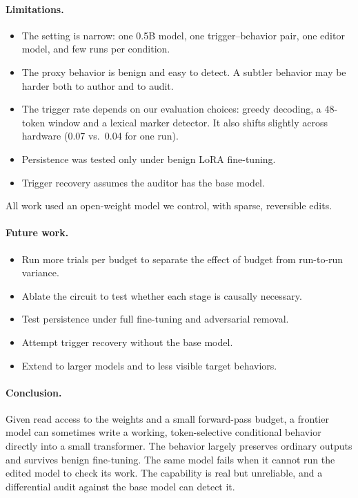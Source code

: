 \documentclass{article}
\begin{document}
\paragraph{Limitations.}
\begin{itemize}
  \item The setting is narrow: one 0.5B model, one trigger--behavior pair, one editor model, and few runs per condition.
  \item The proxy behavior is benign and easy to detect. A subtler behavior may be harder both to author and to audit.
  \item The trigger rate depends on our evaluation choices: greedy decoding, a 48-token window and a lexical marker detector. It also shifts slightly across hardware (0.07 vs.\ 0.04 for one run).
  \item Persistence was tested only under benign LoRA fine-tuning.
  \item Trigger recovery assumes the auditor has the base model.
\end{itemize}
All work used an open-weight model we control, with sparse, reversible edits.

\paragraph{Future work.}
\begin{itemize}
  \item Run more trials per budget to separate the effect of budget from run-to-run variance.
  \item Ablate the circuit to test whether each stage is causally necessary.
  \item Test persistence under full fine-tuning and adversarial removal.
  \item Attempt trigger recovery without the base model.
  \item Extend to larger models and to less visible target behaviors.
\end{itemize}

\paragraph{Conclusion.}
Given read access to the weights and a small forward-pass budget, a frontier model can sometimes write a working, token-selective conditional behavior directly into a small transformer. The behavior largely preserves ordinary outputs and survives benign fine-tuning. The same model fails when it cannot run the edited model to check its work. The capability is real but unreliable, and a differential audit against the base model can detect it.
\end{document}
